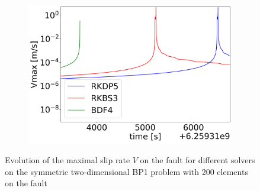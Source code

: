 \documentclass{report}
\begin{document}
\begin{figure}[H]
\begin{subfigure}{0.32\textwidth}
    \end{subfigure}
    \begin{subfigure}{0.32\textwidth}
    	\centering
    	\includegraphics[width=1\textwidth]{images/TANDEMtimeEvolutionVearthquake.png}
    \end{subfigure}
    \caption{Evolution of the maximal slip rate $V$ on the fault for different solvers on the symmetric two-dimensional BP1 problem with 200 elements on the fault}
    \label{fig:timeEvolutionTANDEM_V}
\end{figure}
\end{document}
